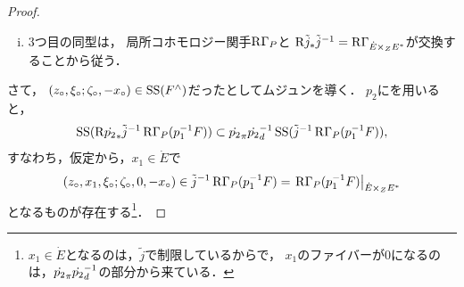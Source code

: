 \begin{proof}
\begin{CMT*}
\begin{enumerate}[(i)]
            \(j\)と\(\tilde{j}\)がどちらも固有射であることから，
            カルテシアン図式
            \[\vcenter{\xymatrix@C=36pt@R=36pt{
                \dot{E}\pb[Z] E^{\ast}
                \ar[d]_-{\dot{p}_{1}}
                \ar@{^{(}->}[r]_-{\tilde{j}}
                \ar@{}[dr]|\square
                &
                E\pb[Z] E^{\ast}
                \ar[d]^-{\mres[\dot{p}_{1}]{E\pb[Z] E^{\ast}}}\\
                \dot{E}
                \ar@{^{(}->}[r]^-{j}
                &
                E
            }}\]における
            固有基底変換を用いて
            \begin{align*}
                p_1^{-1}\Rder{j_{\ast}}j^{-1}F
                &\underset{\text{B.C.}}{\cong} 
                \Rder{\tilde{j}_{\ast}}(\mres[p_1]{\dot{E}\mathbin{\times_{Z}} E^{\ast}})^{-1}j^{-1}F\\
                &\underset{\text{可換図式}}{\cong} 
                \Rder{\tilde{j}_{\ast}}\tilde{j}^{-1}p_1^{-1}F
            \end{align*}
            のように示される．
            \item     
            3つ目の同型は，
            局所コホモロジー関手\(\RG_{P}\)と
            \(
                \Rder{\tilde{j}_{\ast}}\tilde{j}^{-1}
                =
                \RG_{\dot{E}\mathbin{\times_{Z}} E^{\ast}}
            \)が交換することから従う．
        \end{enumerate}
    \end{CMT*}
    \bigskip
    さて，
    \(
        (z_{\circ},\xi_{\circ};\zeta_{\circ},-x_{\circ})
        \in 
        \muS(F^{\wedge})
    \)だったとしてムジュンを導く．
    \(p_2\)に\cite[Prop.5.5.4.(iii)]{KS90}を用いると，
    \[
        \muS(\Rder{\dot{p_{2}}_{\ast}}\tilde{j}^{-1}\RG_{P}(p_{1}^{-1}F))
        \subset
        \mpb[\dot{p_{2}}]\mdiff[\dot{p_{2}}]^{-1}\muS(\tilde{j}^{-1}\RG_{P}(p_{1}^{-1}F)),
    \]
    すなわち，仮定から，\(x_1\in \dot{E}\)で
    \[
        (z_{\circ},x_1,\xi_{\circ};\zeta_{\circ},0,-x_{\circ})
        \in 
        \tilde{j}^{-1}\RG_{P}(p_{1}^{-1}F)
        =
        \mres[\RG_{P}(p_{1}^{-1}F)]{\dot{E}\mathbin{\times_{Z}} E^{\ast}}
    \]
    となるものが存在する\footnote{
        \(x_1\in \dot{E}\)となるのは，\(\tilde{j}\)で制限しているからで，
        \(x_1\)のファイバーが\(0\)になるのは，\(\mpb[\dot{p_{2}}]\mdiff[\dot{p_{2}}]^{-1}\)の部分から来ている．
    }．


\end{proof}
